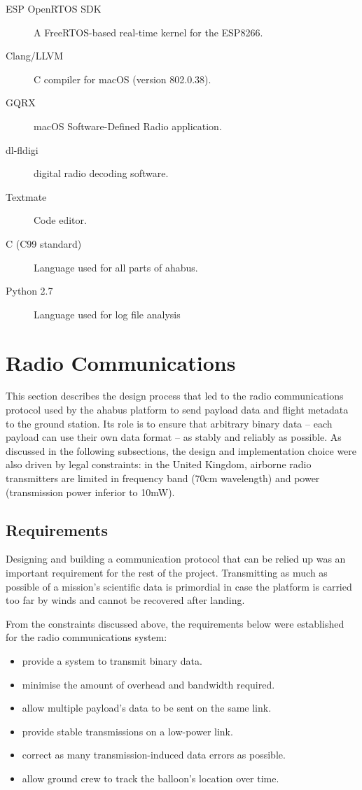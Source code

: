 \begin{description}
    
\item[ESP OpenRTOS SDK] A FreeRTOS-based real-time kernel for the ESP8266.
\item[Clang/LLVM] C compiler for macOS (version 802.0.38).
\item[GQRX] macOS Software-Defined Radio application.
\item[dl-fldigi] digital radio decoding software.
\item[Textmate] Code editor.
\item[C (C99 standard)] Language used for all parts of \acrshort{ahabus}.
\item[Python 2.7] Language used for log file analysis

\end{description}

\section{Radio Communications}
\label{sec:radio-coms}

This section describes the design process that led to the radio communications
protocol used by the \acrshort{ahabus} platform to send payload data and flight metadata
to the ground station. Its role is to ensure that arbitrary binary data – each
payload can use their own data format – as stably and reliably as possible. As
discussed in the following subsections, the design and implementation choice
were also driven by legal constraints: in the United Kingdom, airborne radio
transmitters are limited in frequency band (70cm wavelength) and power
(transmission power inferior to 10mW).

\subsection{Requirements}
\label{ssec:requirements}

Designing and building a communication protocol that can be relied up was an
important requirement for the rest of the project. Transmitting as much as
possible of a mission's scientific data is primordial in case the platform
is carried too far by winds and cannot be recovered after landing.

From the constraints discussed above, the requirements below were established
for the radio communications system:

\begin{itemize}
\item provide a system to transmit binary data.%
\item minimise the amount of overhead and bandwidth required.%
\item allow multiple payload's data to be sent on the same link.%
\item provide stable transmissions on a low-power link.%
\item correct as many transmission-induced data errors as possible.%
\item allow ground crew to track the balloon's location over time.%
\end{itemize}


